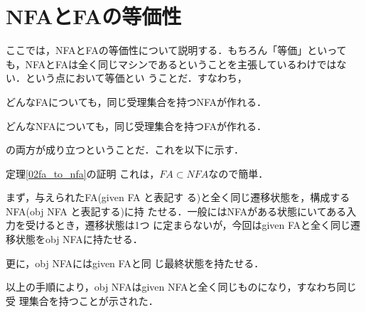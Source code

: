 \section{NFAとFAの等価性}
ここでは，NFAとFAの等価性について説明する．もちろん「等価」といって
も，NFAとFAは全く同じマシンであるということを主張しているわけではな
い．という点において等価とい
うことだ．すなわち，
\begin{mytheorem} \label{02fa_to_nfa}
どんなFAについても，同じ受理集合を持つNFAが作れる．
\end{mytheorem}

\begin{mytheorem} \label{02nfa_to_fa}
 どんなNFAについても，同じ受理集合を持つFAが作れる．
\end{mytheorem}
の両方が成り立つということだ．これを以下に示す．

\begin{myproof}{定理\ref{02fa_to_nfa}の証明}
これは，$FA \subset NFA$なので簡単．

 まず，与えられたFA(given FA と表記す
 る)と全く同じ遷移状態を，構成するNFA(obj NFA と表記する)に持
 たせる．一般にはNFAがある状態にいてある入力を受けるとき，遷移状態は1つ
 に定まらないが，今回はgiven FAと全く同じ遷移状態をobj NFAに持たせる．

 更に，obj NFAにはgiven FAと同
 じ最終状態を持たせる．

以上の手順により，obj NFAはgiven NFAと全く同じものになり，すなわち同じ受
 理集合を持つことが示された．
\end{myproof}

